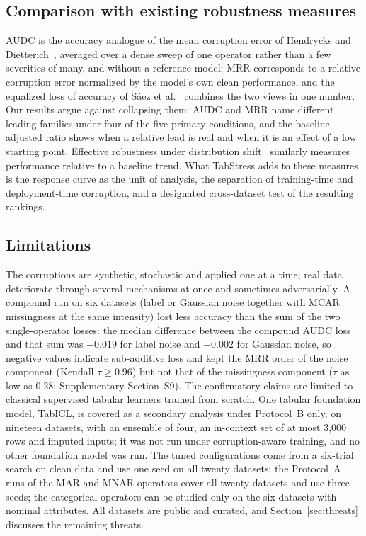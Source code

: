 \documentclass[pdflatex,sn-mathphys]{sn-jnl}
\theoremstyle{thmstyleone}
\theoremstyle{thmstyletwo}
\theoremstyle{thmstylethree}
\begin{document}
\subsection{Comparison with existing robustness measures}\label{sec:disc:measures}

AUDC is the accuracy analogue of the mean corruption error of Hendrycks and Dietterich~\cite{hendrycks2019benchmarking}, averaged over a dense sweep of one operator rather than a few severities of many, and without a reference model; MRR corresponds to a relative corruption error normalized by the model's own clean performance, and the equalized loss of accuracy of S\'aez et al.~\cite{saez2015evaluating} combines the two views in one number. Our results argue against collapsing them: AUDC and MRR name different leading families under four of the five primary conditions, and the baseline-adjusted ratio shows when a relative lead is real and when it is an effect of a low starting point. Effective robustness under distribution shift~\cite{taori2020measuring} similarly measures performance relative to a baseline trend. What TabStress adds to these measures is the response curve as the unit of analysis, the separation of training-time and deployment-time corruption, and a designated cross-dataset test of the resulting rankings.

\subsection{Limitations}\label{sec:disc:limits}

The corruptions are synthetic, stochastic and applied one at a time; real data deteriorate through several mechanisms at once and sometimes adversarially. A compound run on six datasets (label or Gaussian noise together with MCAR missingness at the same intensity) lost less accuracy than the sum of the two single-operator losses: the median difference between the compound AUDC loss and that sum was $-0.019$ for label noise and $-0.002$ for Gaussian noise, so negative values indicate sub-additive loss and kept the MRR order of the noise component (Kendall $\tau\ge0.96$) but not that of the missingness component ($\tau$ as low as 0.28; Supplementary Section~S9). The confirmatory claims are limited to classical supervised tabular learners trained from scratch. One tabular foundation model, TabICL, is covered as a secondary analysis under Protocol~B only, on nineteen datasets, with an ensemble of four, an in-context set of at most 3{,}000 rows and imputed inputs; it was not run under corruption-aware training, and no other foundation model was run. The tuned configurations come from a six-trial search on clean data and use one seed on all twenty datasets; the Protocol~A runs of the MAR and MNAR operators cover all twenty datasets and use three seeds; the categorical operators can be studied only on the six datasets with nominal attributes. All datasets are public and curated, and Section~\ref{sec:threats} discusses the remaining threats.
\end{document}

